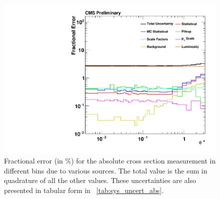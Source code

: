 \begin{figure}[!htbp]
    \centering
    \includegraphics[width=\textwidth]{figures/data_uncertainty_absolute.pdf}
    \caption[
        Fractional errors (in \%) for the absolute cross section measurement.
    ]{
        Fractional error (in \%) for the absolute cross section measurement in
        different \phistar bins due to various sources. The total value is the
        sum in quadrature of all the other values. These uncertainties are also
        presented in tabular form in \TAB~\ref{tab:sys_uncert_abs}.
    }
    \label{fig:sys_uncert_abs}
\end{figure}
